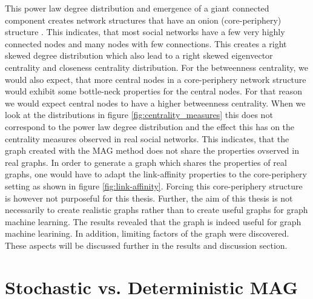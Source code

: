   \noindent This power law degree distribution and emergence of a giant
  connected component creates network structures that have an onion
  (core-periphery) structure \citep[p. 121]{kim2012multiplicative}. This
  indicates, that most social networks have a few very highly connected nodes
  and many nodes with few connections. This creates a right skewed degree 
  distribution which also lead to a right skewed eigenvector centrality and
  closeness centrality distribution. For the betweenness centrality, we would
  also expect, that more central nodes in a core-periphery network structure
  would exhibit some bottle-neck properties for the central nodes. For that
  reason we would expect central nodes to have a higher betweenness centrality.
  When we look at the distributions in figure \ref{fig:centrality_measures}
  this does not correspond to the power law degree distribution and the effect
  this has on the centrality measures observed in real social networks. This
  indicates, that the graph created with the MAG method does not share the
  properties ovserved in real graphs. In order to generate a graph which
  shares the properties of real graphs, one would have to adapt the 
  link-affinity properties to the core-periphery setting as shown in figure
  \ref{fig:link-affinity}. Forcing this core-periphery structure is however not
  purposeful for this thesis. Further, the aim of this thesis is not
  necessarily to create realistic graphs rather than to create useful graphs 
  for graph machine learning. The results revealed that the graph is indeed
  useful for graph machine learining. In addition, limiting factors of the
  graph were discovered. These aspects will be discussed further in the results
  and discussion section. 


  \section{Stochastic vs. Deterministic MAG}


